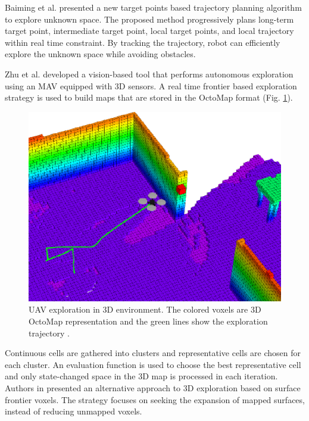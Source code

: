 Baiming et al. \cite{Baiming2018} presented a new target points based trajectory planning algorithm to explore unknown space. The proposed method progressively plans long-term target point, intermediate target point, local target points, and local trajectory within real time constraint. By tracking the trajectory, robot can efficiently explore the unknown space while avoiding obstacles.

Zhu et al. \cite{Zhu2015} developed a vision-based tool that performs autonomous exploration using an MAV equipped with 3D sensors. A real time frontier based exploration strategy is used to build maps that are stored in the OctoMap format (Fig. \ref{fig:octomap}).

\begin{figure}[t!]
	\centering
	\includegraphics[width=1.0\columnwidth]{./pictures/octomap_and_drone.png}	
	\caption{UAV exploration in 3D environment. The colored voxels are 3D OctoMap representation and the green lines show the exploration trajectory \cite{Wang2019}.}
	\label{fig:octomap}
\end{figure}

Continuous cells are gathered into clusters and representative cells are chosen for each cluster. An evaluation function is used to choose the best representative cell and only state-changed space in the 3D map is processed in each iteration. Authors in \cite{Senarathne2016} presented an alternative approach to 3D exploration based on surface frontier voxels. The strategy focuses on seeking the expansion of mapped surfaces, instead of reducing unmapped voxels. 

